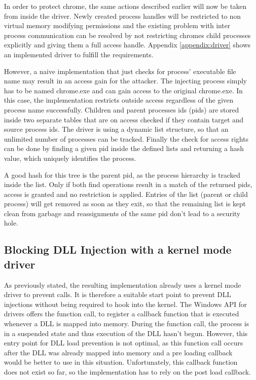 In order to protect chrome, the same actions described earlier will now be taken from inside the driver. Newly created process handles will be restricted to non virtual memory modifying permissions and the existing problem with inter process communication can be resolved by not restricting chromes child processes explicitly and giving them a full access handle. Appendix \ref{appendix:driver} shows an implemented driver to fulfill the requirements.

However, a naive implementation that just checks for process' executable file name may result in an access gain for the attacker. The injecting process simply has to be named chrome.exe and can gain access to the original chrome.exe. In this case, the implementation restricts outside access regardless of the given process name successfully. Children and parent processes ids (pids) are stored inside two separate tables that are on access checked if they contain target and source process ids. The driver is using a dynamic list structure, so that an unlimited number of processes can be tracked. Finally the check for access rights can be done by finding a given pid inside the defined lists and returning a hash value, which uniquely identifies the process. 

A good hash for this tree is the parent pid, as the process hierarchy is tracked inside the list. Only if both find operations result in a match of the returned pids, access is granted and no restriction is applied. Entries of the list (parent or child process) will get removed as soon as they exit, so that the remaining list is kept clean from garbage and reassignments of the same pid don't lead to a security hole.

\subsection{Blocking DLL Injection with a kernel mode driver}
As previously stated, the resulting implementation already uses a kernel mode driver to prevent  calls. It is therefore a suitable start point to prevent DLL injections without being required to hook into the kernel. The Windows API for drivers offers the  function call, to register a callback function that is executed whenever a DLL is mapped into memory. During the function call, the process is in a suspended state and thus execution of the DLL hasn't begun. However, this entry point for DLL load prevention is not optimal, as this function call occurs after the DLL was already mapped into memory and a pre loading callback would be better to use in this situation. Unfortunately, this callback function does not exist so far, so the implementation has to rely on the post load callback.

